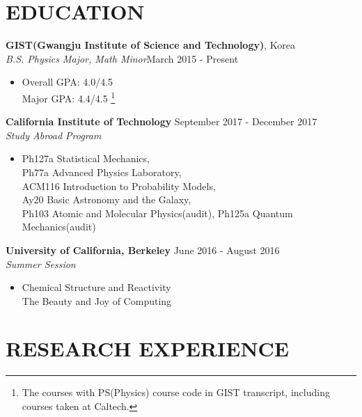 \documentclass[margin, 10pt]{res} %
\begin{document}
\begin{resume}

 
\section{EDUCATION}  

{\bf GIST(Gwangju Institute of Science and Technology)}, Korea\\
{\sl B.S. Physics Major, Math Minor}\hfill March 2015 - Present
\begin{itemize}
\small\item[] Overall GPA: 4.0/4.5\\
Major GPA: 4.4/4.5 \footnote{The courses with PS(Physics) course code in GIST transcript, including courses taken at Caltech.}
\end{itemize}

{\bf California Institute of Technology}  \hfill September 2017 - December 2017 \\
{\sl Study Abroad Program}
\begin{itemize}
\small\item[] Ph127a Statistical Mechanics,\\
Ph77a Advanced Physics Laboratory,\\
ACM116 Introduction to Probability Models,\\
Ay20 Basic Astronomy and the Galaxy,\\
Ph103 Atomic and Molecular Physics(audit), Ph125a Quantum Mechanics(audit)
\end{itemize}

{\bf University of California, Berkeley}  \hfill June 2016 - August 2016 \\
{\sl Summer Session}
\begin{itemize}
\small\item[] Chemical Structure and Reactivity\\
The Beauty and Joy of Computing
\end{itemize}


 
\section{RESEARCH EXPERIENCE}


\end{resume}
\end{document}
